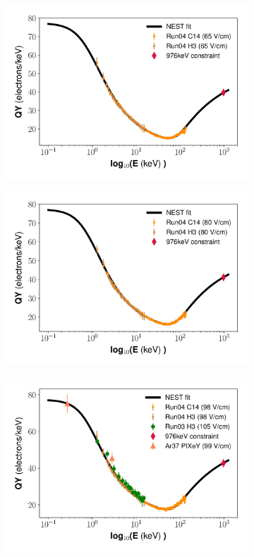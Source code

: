 \begin{figure}[h!]
\begin{subfigure}{0.5\textwidth}
  \includegraphics[width=\textwidth]{Figures/Yields_fit_old/NEST_fit_65Vcm_old_dcm.pdf}
  \caption{}
\end{subfigure}%
\begin{subfigure}{0.5\textwidth}
  \centering
  \includegraphics[width=\textwidth]{Figures/Yields_fit_old/NEST_fit_80Vcm_old_dcm.pdf}
  \caption{}
\end{subfigure}
\begin{subfigure}{0.5\textwidth}
  \centering
  \includegraphics[width=\textwidth]{Figures/Yields_fit_old/NEST_fit_98Vcm_old_dcm.pdf}

\end{subfigure}
\end{figure}
